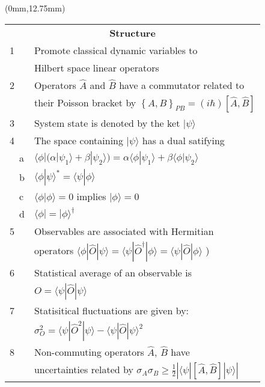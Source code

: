 \documentclass[10pt]{article}
\begin{document}
\begin{textblock*}{74mm}(0mm,12.75mm)
\begin{tabular*}{74mm}{|l @{\extracolsep{\fill}} l|}\hline
\multicolumn{2}{|c|}{\bf Structure} \\
1  & Promote classical dynamic variables to\\
   & Hilbert space linear operators \hfill\\
2  & Operators $\hat A$ and $\hat B$ have a commutator related to \\
   & their Poisson bracket by $\left\{ A, B \right\}_{PB} = \left( i \hbar \right) \left[ \hat A, \hat B \right]$\\
3  & System state is denoted by the ket $| \psi \rangle$ \\
4  & The space containing $| \psi \rangle$ has a dual satifying\\
~~a& $ \langle \phi | \big( \alpha | \psi_1 \rangle + \beta | \psi_2 \rangle \big) 
     = \alpha \langle \phi | \psi_1 \rangle + \beta \langle \phi | \psi_2 \rangle$ \\
~~b& $\langle \phi | \psi \rangle ^* = \langle \psi | \phi \rangle$ \\
~~c& $\langle \phi | \phi \rangle = 0$ implies $| \phi \rangle = 0$ \\
~~d& $\langle \phi | = | \phi \rangle ^{\dagger}$ \\
5  & Observables are associated with Hermitian \\
   & operators $\langle \phi | \hat O | \psi \rangle
        = \langle \psi | \hat O ^ \dagger | \phi \rangle 
        = \langle \psi | \hat O | \phi \rangle$ )\\
6  & Statistical average of an observable is \\
   &$O = \langle \psi | \hat O | \psi \rangle$\\
7  & Statisitical fluctuations are given by:\\
   &$\sigma_{O}^2 = \langle \psi | \hat O ^2 | \psi \rangle 
     - \langle \psi | \hat O | \psi \rangle ^2$ \\
8  &Non-commuting operators $\hat A$, $\hat B$ have\\
   &uncertainties related by $ \sigma_A \sigma_B 
    \ge \frac{1}{2} \left| \langle \psi | [ \hat A , \hat B ] | \psi \rangle \right|$\\
\hline
\end{tabular*}
\end{textblock*}
\end{document}
